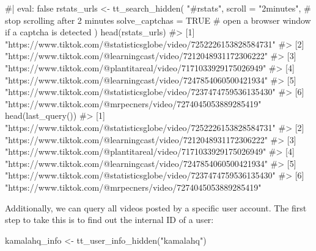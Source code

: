 \documentclass[
  nobib]{ccr}
\newenvironment{Shaded}{\begin{snugshade}}{\end{snugshade}}
\newcommand{\AttributeTok}[1]{\textcolor[rgb]{0.40,0.45,0.13}{#1}}
\newcommand{\CommentTok}[1]{\textcolor[rgb]{0.37,0.37,0.37}{#1}}
\newcommand{\ConstantTok}[1]{\textcolor[rgb]{0.56,0.35,0.01}{#1}}
\newcommand{\FunctionTok}[1]{\textcolor[rgb]{0.28,0.35,0.67}{#1}}
\newcommand{\NormalTok}[1]{\textcolor[rgb]{0.00,0.23,0.31}{#1}}
\newcommand{\OtherTok}[1]{\textcolor[rgb]{0.00,0.23,0.31}{#1}}
\newcommand{\StringTok}[1]{\textcolor[rgb]{0.13,0.47,0.30}{#1}}
\begin{document}
\begin{Shaded}
\begin{Highlighting}[]
\CommentTok{\#| eval: false}
\NormalTok{rstats\_urls }\OtherTok{\textless{}{-}} \FunctionTok{tt\_search\_hidden}\NormalTok{(}
    \StringTok{"\#rstats"}\NormalTok{,}
    \AttributeTok{scroll =} \StringTok{"2minutes"}\NormalTok{,       }\CommentTok{\# stop scrolling after 2 minutes}
    \AttributeTok{solve\_captchas =} \ConstantTok{TRUE}      \CommentTok{\# open a browser window if a captcha is detected}
\NormalTok{  )}
\FunctionTok{head}\NormalTok{(rstats\_urls)}
\CommentTok{\#\textgreater{}  [1] "https://www.tiktok.com/@statisticsglobe/video/7252226153828584731"     }
\CommentTok{\#\textgreater{}  [2] "https://www.tiktok.com/@learningcast/video/7212048931172306222"        }
\CommentTok{\#\textgreater{}  [3] "https://www.tiktok.com/@plantitareal/video/7171033929175026949"        }
\CommentTok{\#\textgreater{}  [4] "https://www.tiktok.com/@learningcast/video/7247854060500421934"        }
\CommentTok{\#\textgreater{}  [5] "https://www.tiktok.com/@statisticsglobe/video/7237474759536135430"     }
\CommentTok{\#\textgreater{}  [6] "https://www.tiktok.com/@mrpecners/video/7274045053889285419"}
\FunctionTok{head}\NormalTok{(}\FunctionTok{last\_query}\NormalTok{())}
\CommentTok{\#\textgreater{}  [1] "https://www.tiktok.com/@statisticsglobe/video/7252226153828584731"     }
\CommentTok{\#\textgreater{}  [2] "https://www.tiktok.com/@learningcast/video/7212048931172306222"        }
\CommentTok{\#\textgreater{}  [3] "https://www.tiktok.com/@plantitareal/video/7171033929175026949"        }
\CommentTok{\#\textgreater{}  [4] "https://www.tiktok.com/@learningcast/video/7247854060500421934"        }
\CommentTok{\#\textgreater{}  [5] "https://www.tiktok.com/@statisticsglobe/video/7237474759536135430"     }
\CommentTok{\#\textgreater{}  [6] "https://www.tiktok.com/@mrpecners/video/7274045053889285419"   }
\end{Highlighting}
\end{Shaded}

Additionally, we can query all videos posted by a specific user account.
The first step to take this is to find out the internal ID of a user:

\begin{Shaded}
\begin{Highlighting}[]
\NormalTok{kamalahq\_info }\OtherTok{\textless{}{-}} \FunctionTok{tt\_user\_info\_hidden}\NormalTok{(}\StringTok{"kamalahq"}\NormalTok{)}
\end{Highlighting}
\end{Shaded}
\end{document}
